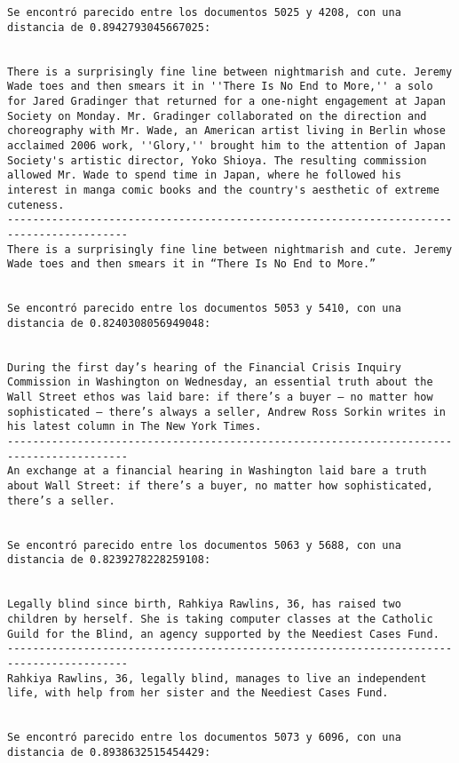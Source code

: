 \documentclass[11pt]{article}
\begin{document}
\begin{Verbatim}[commandchars=\\\{\}]
Se encontró parecido entre los documentos 5025 y 4208, con una distancia de 0.8942793045667025:


There is a surprisingly fine line between nightmarish and cute. Jeremy Wade toes and then smears it in ''There Is No End to More,'' a solo for Jared Gradinger that returned for a one-night engagement at Japan Society on Monday. Mr. Gradinger collaborated on the direction and choreography with Mr. Wade, an American artist living in Berlin whose acclaimed 2006 work, ''Glory,'' brought him to the attention of Japan Society's artistic director, Yoko Shioya. The resulting commission allowed Mr. Wade to spend time in Japan, where he followed his interest in manga comic books and the country's aesthetic of extreme cuteness.
-----------------------------------------------------------------------------------------
There is a surprisingly fine line between nightmarish and cute. Jeremy Wade toes and then smears it in “There Is No End to More.”


Se encontró parecido entre los documentos 5053 y 5410, con una distancia de 0.8240308056949048:


During the first day’s hearing of the Financial Crisis Inquiry Commission in Washington on Wednesday, an essential truth about the Wall Street ethos was laid bare: if there’s a buyer — no matter how sophisticated — there’s always a seller, Andrew Ross Sorkin writes in his latest column in The New York Times.
-----------------------------------------------------------------------------------------
An exchange at a financial hearing in Washington laid bare a truth about Wall Street: if there’s a buyer, no matter how sophisticated, there’s a seller.


Se encontró parecido entre los documentos 5063 y 5688, con una distancia de 0.8239278228259108:


Legally blind since birth, Rahkiya Rawlins, 36, has raised two children by herself. She is taking computer classes at the Catholic Guild for the Blind, an agency supported by the Neediest Cases Fund.
-----------------------------------------------------------------------------------------
Rahkiya Rawlins, 36, legally blind, manages to live an independent life, with help from her sister and the Neediest Cases Fund.


Se encontró parecido entre los documentos 5073 y 6096, con una distancia de 0.8938632515454429:



\end{Verbatim}
\end{document}
